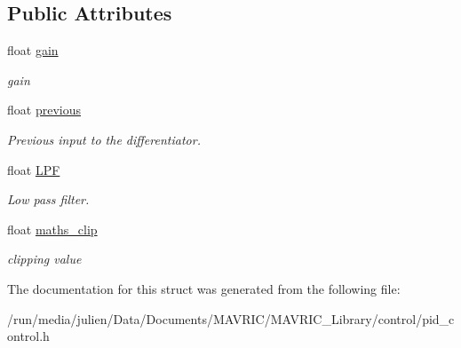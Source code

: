 \subsection*{Public Attributes}
\begin{DoxyCompactItemize}
\item 
\hypertarget{structdifferentiator__t_a9422aa77a4f9e672b66f6ce5a2083cf5}{float \hyperlink{structdifferentiator__t_a9422aa77a4f9e672b66f6ce5a2083cf5}{gain}}\label{structdifferentiator__t_a9422aa77a4f9e672b66f6ce5a2083cf5}

\begin{DoxyCompactList}\small\item\em gain \end{DoxyCompactList}\item 
\hypertarget{structdifferentiator__t_aeb182ef453f3d4546989e9f1d81aea62}{float \hyperlink{structdifferentiator__t_aeb182ef453f3d4546989e9f1d81aea62}{previous}}\label{structdifferentiator__t_aeb182ef453f3d4546989e9f1d81aea62}

\begin{DoxyCompactList}\small\item\em Previous input to the differentiator. \end{DoxyCompactList}\item 
\hypertarget{structdifferentiator__t_ae9081c2849c15bcc8577465e468928c6}{float \hyperlink{structdifferentiator__t_ae9081c2849c15bcc8577465e468928c6}{L\+P\+F}}\label{structdifferentiator__t_ae9081c2849c15bcc8577465e468928c6}

\begin{DoxyCompactList}\small\item\em Low pass filter. \end{DoxyCompactList}\item 
\hypertarget{structdifferentiator__t_a28b314b1fc0b165c502cff89c75b25a4}{float \hyperlink{structdifferentiator__t_a28b314b1fc0b165c502cff89c75b25a4}{maths\+\_\+clip}}\label{structdifferentiator__t_a28b314b1fc0b165c502cff89c75b25a4}

\begin{DoxyCompactList}\small\item\em clipping value \end{DoxyCompactList}\end{DoxyCompactItemize}


The documentation for this struct was generated from the following file\+:\begin{DoxyCompactItemize}
\item 
/run/media/julien/\+Data/\+Documents/\+M\+A\+V\+R\+I\+C/\+M\+A\+V\+R\+I\+C\+\_\+\+Library/control/pid\+\_\+control.\+h\end{DoxyCompactItemize}
